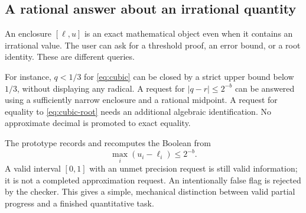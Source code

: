 \subsection{A rational answer about an irrational quantity}
An enclosure $[\ell,u]$ is an exact mathematical object even when it contains an irrational value. The user can ask for a threshold proof, an error bound, or a root identity. These are different queries.

For instance, $q<1/3$ for \eqref{eq:cubic} can be closed by a strict upper bound below $1/3$, without displaying any radical. A request for $|q-r|\le2^{-b}$ can be answered using a sufficiently narrow enclosure and a rational midpoint. A request for equality to \eqref{eq:cubic-root} needs an additional algebraic identification. No approximate decimal is promoted to exact equality.

The prototype records  and recomputes the Boolean  from
\[
 \max_i(u_i-\ell_i)\le2^{-b}.
\]
A valid interval $[0,1]$ with an unmet precision request is still valid information; it is not a completed approximation request. An intentionally false  flag is rejected by the checker. This gives a simple, mechanical distinction between valid partial progress and a finished quantitative task.
